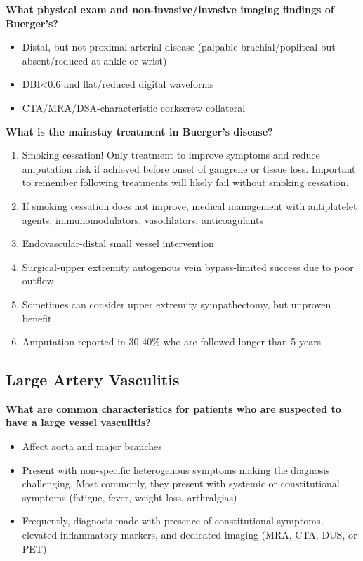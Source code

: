 \documentclass[
]{book}
\begin{document}
\textbf{What physical exam and non-invasive/invasive imaging findings of
Buerger's?}

\begin{itemize}
\item
  Distal, but not proximal arterial disease (palpable
  brachial/popliteal but absent/reduced at ankle or wrist)
\item
  DBI\textless0.6 and flat/reduced digital waveforms
\item
  CTA/MRA/DSA-characteristic corkscrew collateral
\end{itemize}

\textbf{What is the mainstay treatment in Buerger's disease?}

\begin{enumerate}
\def\labelenumi{\arabic{enumi}.}
\item
  Smoking cessation! Only treatment to improve symptoms and reduce
  amputation risk if achieved before onset of gangrene or tissue loss.
  Important to remember following treatments will likely fail without
  smoking cessation.
\item
  If smoking cessation does not improve, medical management with
  antiplatelet agents, immunomodulators, vasodilators, anticoagulants~
\item
  Endovascular-distal small vessel intervention
\item
  Surgical-upper extremity autogenous vein bypass-limited success due
  to poor outflow~
\item
  Sometimes can consider upper extremity sympathectomy, but unproven
  benefit~
\item
  Amputation-reported in 30-40\% who are followed longer than 5 years~
\end{enumerate}

\hypertarget{large-artery-vasculitis}{%
\subsection{\texorpdfstring{\textbf{Large Artery Vasculitis}}{Large Artery Vasculitis}}\label{large-artery-vasculitis}}

\textbf{What are common characteristics for patients who are suspected to have
a large vessel vasculitis?} \citep{shanmugam137VasculitisOther2019}

\begin{itemize}
\item
  Affect aorta and major branches
\item
  Present with non-specific heterogenous symptoms making the diagnosis
  challenging. Most commonly, they present with systemic or
  constitutional symptoms (fatigue, fever, weight loss, arthralgias)
\item
  Frequently, diagnosis made with presence of constitutional symptoms,
  elevated inflammatory markers, and dedicated imaging (MRA, CTA, DUS,
  or PET)
\end{itemize}
\end{document}
